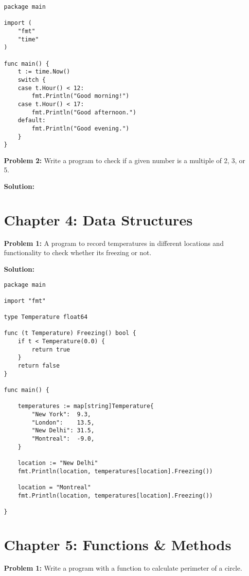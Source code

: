 \begin{lstlisting}[numbers=none]
package main

import (
    "fmt"
    "time"
)

func main() {
    t := time.Now()
    switch {
    case t.Hour() < 12:
        fmt.Println("Good morning!")
    case t.Hour() < 17:
        fmt.Println("Good afternoon.")
    default:
        fmt.Println("Good evening.")
    }
}
\end{lstlisting}

\textbf{Problem 2:} Write a program to check if a given number is a multiple of 2, 3, or 5.

\textbf{Solution:}



\section*{Chapter 4: Data Structures}

\textbf{Problem 1:} A program to record temperatures
in different locations and functionality to check whether its freezing
or not.

\textbf{Solution:}

\begin{lstlisting}[numbers=none]
package main

import "fmt"

type Temperature float64

func (t Temperature) Freezing() bool {
    if t < Temperature(0.0) {
        return true
    }
    return false
}

func main() {

    temperatures := map[string]Temperature{
        "New York":  9.3,
        "London":    13.5,
        "New Delhi": 31.5,
        "Montreal":  -9.0,
    }

    location := "New Delhi"
    fmt.Println(location, temperatures[location].Freezing())

    location = "Montreal"
    fmt.Println(location, temperatures[location].Freezing())

}
\end{lstlisting}

\section*{Chapter 5: Functions \& Methods}

\textbf{Problem 1:} Write a program with a function to calculate perimeter of a circle.

